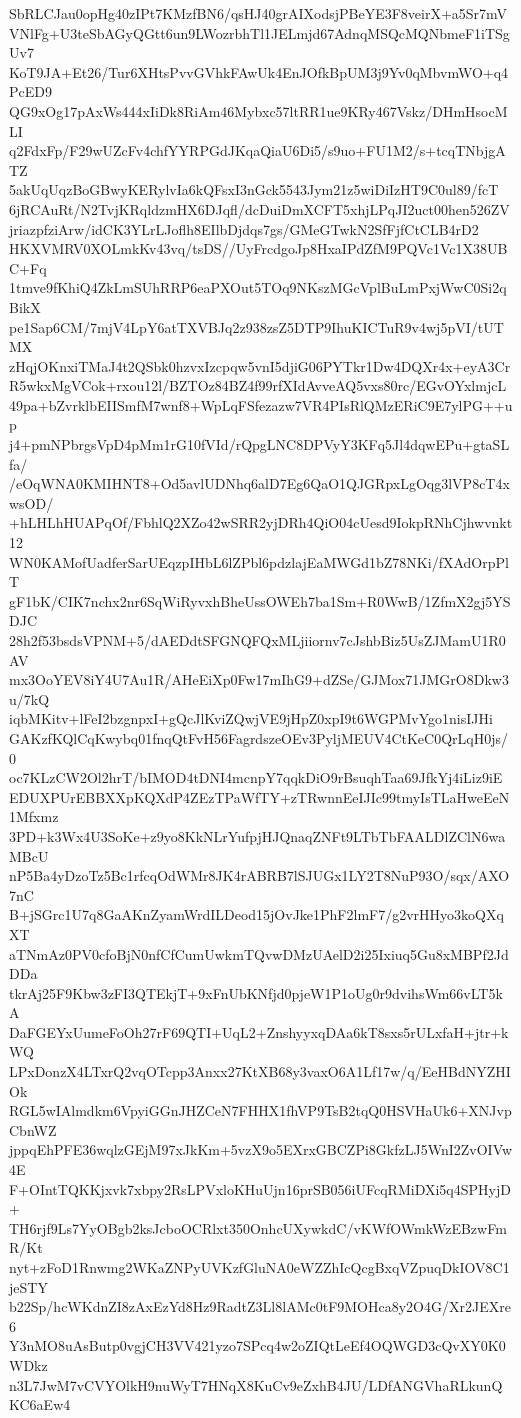 SbRLCJau0opHg40zIPt7KMzfBN6/qsHJ40grAIXodsjPBeYE3F8veirX+a5Sr7mV
VNlFg+U3teSbAGyQGtt6un9LWozrbhTl1JELmjd67AdnqMSQcMQNbmeF1iTSgUv7
KoT9JA+Et26/Tur6XHtsPvvGVhkFAwUk4EnJOfkBpUM3j9Yv0qMbvmWO+q4PcED9
QG9xOg17pAxWs444xIiDk8RiAm46Mybxc57ltRR1ue9KRy467Vskz/DHmHsocMLI
q2FdxFp/F29wUZcFv4chfYYRPGdJKqaQiaU6Di5/s9uo+FU1M2/s+tcqTNbjgATZ
5akUqUqzBoGBwyKERylvIa6kQFsxI3nGck5543Jym21z5wiDiIzHT9C0ul89/fcT
6jRCAuRt/N2TvjKRqldzmHX6DJqfl/dcDuiDmXCFT5xhjLPqJI2uct00hen526ZV
jriazpfziArw/idCK3YLrLJoflh8EIlbDjdqs7gs/GMeGTwkN2SfFjfCtCLB4rD2
HKXVMRV0XOLmkKv43vq/tsDS//UyFrcdgoJp8HxaIPdZfM9PQVc1Vc1X38UBC+Fq
1tmve9fKhiQ4ZkLmSUhRRP6eaPXOut5TOq9NKszMGcVplBuLmPxjWwC0Si2qBikX
pe1Sap6CM/7mjV4LpY6atTXVBJq2z938zsZ5DTP9IhuKICTuR9v4wj5pVI/tUTMX
zHqjOKnxiTMaJ4t2QSbk0hzvxIzcpqw5vnI5djiG06PYTkr1Dw4DQXr4x+eyA3Cr
R5wkxMgVCok+rxou12l/BZTOz84BZ4f99rfXIdAvveAQ5vxs80rc/EGvOYxlmjcL
49pa+bZvrklbEIISmfM7wnf8+WpLqFSfezazw7VR4PIsRlQMzERiC9E7ylPG++up
j4+pmNPbrgsVpD4pMm1rG10fVId/rQpgLNC8DPVyY3KFq5Jl4dqwEPu+gtaSLfa/
/eOqWNA0KMIHNT8+Od5avlUDNhq6alD7Eg6QaO1QJGRpxLgOqg3lVP8cT4xwsOD/
+hLHLhHUAPqOf/FbhlQ2XZo42wSRR2yjDRh4QiO04cUesd9IokpRNhCjhwvnkt12
WN0KAMofUadferSarUEqzpIHbL6lZPbl6pdzlajEaMWGd1bZ78NKi/fXAdOrpPlT
gF1bK/CIK7nchx2nr6SqWiRyvxhBheUssOWEh7ba1Sm+R0WwB/1ZfmX2gj5YSDJC
28h2f53bsdsVPNM+5/dAEDdtSFGNQFQxMLjiiornv7cJshbBiz5UsZJMamU1R0AV
mx3OoYEV8iY4U7Au1R/AHeEiXp0Fw17mIhG9+dZSe/GJMox71JMGrO8Dkw3u/7kQ
iqbMKitv+lFeI2bzgnpxI+gQcJlKviZQwjVE9jHpZ0xpI9t6WGPMvYgo1nisIJHi
GAKzfKQlCqKwybq01fnqQtFvH56FagrdszeOEv3PyljMEUV4CtKeC0QrLqH0js/0
oc7KLzCW2Ol2hrT/bIMOD4tDNI4mcnpY7qqkDiO9rBsuqhTaa69JfkYj4iLiz9iE
EDUXPUrEBBXXpKQXdP4ZEzTPaWfTY+zTRwnnEeIJIc99tmyIsTLaHweEeN1Mfxmz
3PD+k3Wx4U3SoKe+z9yo8KkNLrYufpjHJQnaqZNFt9LTbTbFAALDlZClN6waMBcU
nP5Ba4yDzoTz5Bc1rfcqOdWMr8JK4rABRB7lSJUGx1LY2T8NuP93O/sqx/AXO7nC
B+jSGrc1U7q8GaAKnZyamWrdILDeod15jOvJke1PhF2lmF7/g2vrHHyo3koQXqXT
aTNmAz0PV0cfoBjN0nfCfCumUwkmTQvwDMzUAelD2i25Ixiuq5Gu8xMBPf2JdDDa
tkrAj25F9Kbw3zFI3QTEkjT+9xFnUbKNfjd0pjeW1P1oUg0r9dvihsWm66vLT5kA
DaFGEYxUumeFoOh27rF69QTI+UqL2+ZnshyyxqDAa6kT8sxs5rULxfaH+jtr+kWQ
LPxDonzX4LTxrQ2vqOTcpp3Anxx27KtXB68y3vaxO6A1Lf17w/q/EeHBdNYZHIOk
RGL5wIAlmdkm6VpyiGGnJHZCeN7FHHX1fhVP9TsB2tqQ0HSVHaUk6+XNJvpCbnWZ
jppqEhPFE36wqlzGEjM97xJkKm+5vzX9o5EXrxGBCZPi8GkfzLJ5WnI2ZvOIVw4E
F+OIntTQKKjxvk7xbpy2RsLPVxloKHuUjn16prSB056iUFcqRMiDXi5q4SPHyjD+
TH6rjf9Ls7YyOBgb2ksJcboOCRlxt350OnhcUXywkdC/vKWfOWmkWzEBzwFmR/Kt
nyt+zFoD1Rnwmg2WKaZNPyUVKzfGluNA0eWZZhIcQcgBxqVZpuqDkIOV8C1jeSTY
b22Sp/hcWKdnZI8zAxEzYd8Hz9RadtZ3Ll8lAMc0tF9MOHca8y2O4G/Xr2JEXre6
Y3nMO8uAsButp0vgjCH3VV421yzo7SPcq4w2oZIQtLeEf4OQWGD3cQvXY0K0WDkz
n3L7JwM7vCVYOlkH9nuWyT7HNqX8KuCv9eZxhB4JU/LDfANGVhaRLkunQKC6aEw4

